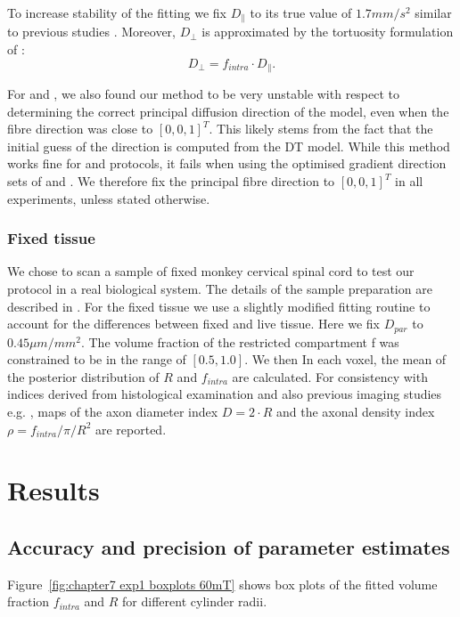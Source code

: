 To increase stability of the fitting we fix $D_\parallel$ to its true value of $1.7mm/s^2$ similar to previous studies \citep{Assaf:2008,Barazany:2009,Alexander:2010}. Moreover, $D_\bot$ is approximated by the tortuosity formulation of \citep{Szafer:1995}:
$$
    D_{\bot} = f_{intra}\cdot D_{\parallel}.
$$


For {\DO} and {\FD}, we also found our method to be very unstable with respect to determining the correct principal diffusion direction of the model, even when the fibre direction was close to $[0,0,1]^T$. This likely stems from the fact that the initial guess of the direction is computed from the \gls{DT} model. While this method works fine for \OI and \SD protocols, it fails when using the optimised gradient direction sets of \DO and \FD. We therefore fix the principal fibre direction to $[0,0,1]^T$ in all experiments, unless stated otherwise.

\subsubsection*{Fixed tissue}
We chose to scan a sample of fixed monkey cervical spinal cord to test our protocol in a real biological system. The details of the sample preparation are described in \citep{Lundell:2011}. For the fixed tissue we use a slightly modified fitting routine to account for the differences between fixed and live tissue. Here we fix $D_{par}$ to $0.45\mu m/mm^2$. The volume fraction of the restricted compartment f was constrained to be in the range of $[0.5, 1.0]$. We then In each voxel, the mean of the posterior distribution of $R$ and $f_{intra}$ are calculated. For consistency with indices derived from histological examination and also previous imaging studies e.g. \citep{Alexander:2010}, maps of the axon diameter index $D=2\cdot R$ and the axonal density index $\rho=f_{intra}/\pi/R^2$ are reported.

\FloatBarrier

\section{Results}
\subsection{Accuracy and precision of parameter estimates}
Figure~\ref{fig:chapter7 exp1 boxplots 60mT} shows box plots of the fitted volume fraction $f_{intra}$ and $R$ for different cylinder radii.

